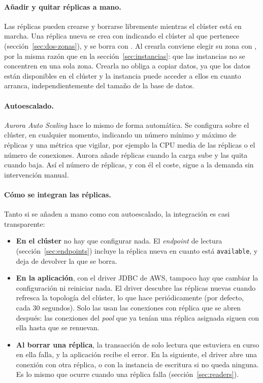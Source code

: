\documentclass[12pt,a4paper]{article}
\begin{document}
\paragraph{Añadir y quitar réplicas a mano.} Las réplicas pueden crearse y borrarse libremente mientras el clúster está en marcha. Una réplica nueva se crea con \texttt{} indicando el clúster al que pertenece (sección~\ref{sec:dos-zonas}), y se borra con \texttt{}. Al crearla conviene elegir su zona con \texttt{}, por la misma razón que en la sección~\ref{sec:instancias}: que las instancias no se concentren en una sola zona. Crearla no obliga a copiar datos, ya que los datos están disponibles en el clúster y la instancia puede acceder a ellos en cuanto arranca, independientemente del tamaño de la base de datos.

\paragraph{Autoescalado.} \textit{Aurora Auto Scaling} hace lo mismo de forma automática. Se configura sobre el clúster, en cualquier momento, indicando un número mínimo y máximo de réplicas y una métrica que vigilar, por ejemplo la CPU media de las réplicas o el número de conexiones. Aurora añade réplicas cuando la carga sube y las quita cuando baja. Así el número de réplicas, y con él el coste, sigue a la demanda sin intervención manual.

\paragraph{Cómo se integran las réplicas.} Tanto si se añaden a mano como con autoescalado, la integración es casi transparente:

\begin{itemize}
    \item \textbf{En el clúster} no hay que configurar nada. El \textit{endpoint} de lectura (sección~\ref{sec:endpoints}) incluye la réplica nueva en cuanto está \texttt{available}, y deja de devolver la que se borra.
    \item \textbf{En la aplicación}, con el driver JDBC de AWS, tampoco hay que cambiar la configuración ni reiniciar nada. El driver descubre las réplicas nuevas cuando refresca la topología del clúster, lo que hace periódicamente (por defecto, cada 30 segundos). Solo las usan las conexiones con réplica que se abren después: las conexiones del \textit{pool} que ya tenían una réplica asignada siguen con ella hasta que se renuevan.
    \item \textbf{Al borrar una réplica}, la transacción de solo lectura que estuviera en curso en ella falla, y la aplicación recibe el error. En la siguiente, el driver abre una conexión con otra réplica, o con la instancia de escritura si no queda ninguna. Es lo mismo que ocurre cuando una réplica falla (sección~\ref{sec:readers}).
\end{itemize}
\end{document}
